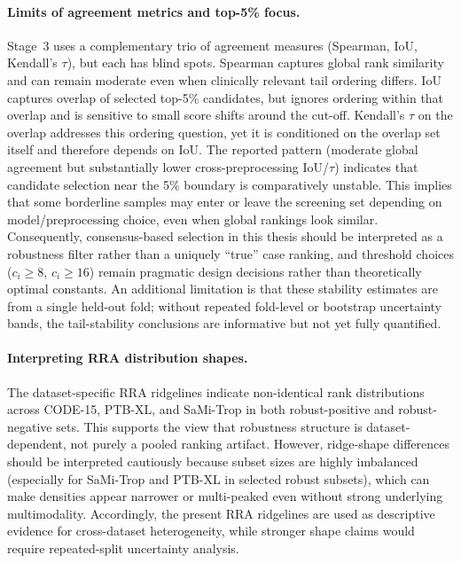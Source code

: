 \paragraph{Limits of agreement metrics and top-5\% focus.}
Stage~3 uses a complementary trio of agreement measures (Spearman, IoU, Kendall's \(\tau\)), but each has blind spots.
Spearman captures global rank similarity and can remain moderate even when clinically relevant tail ordering differs.
IoU captures overlap of selected top-5\% candidates, but ignores ordering within that overlap and is sensitive to small score shifts around the cut-off.
Kendall's \(\tau\) on the overlap addresses this ordering question, yet it is conditioned on the overlap set itself and therefore depends on IoU.
The reported pattern (moderate global agreement but substantially lower cross-preprocessing IoU/\(\tau\)) indicates that candidate selection near the 5\% boundary is comparatively unstable.
This implies that some borderline samples may enter or leave the screening set depending on model/preprocessing choice, even when global rankings look similar.
Consequently, consensus-based selection in this thesis should be interpreted as a robustness filter rather than a uniquely ``true'' case ranking, and threshold choices (\(c_i\geq 8\), \(c_i\geq 16\)) remain pragmatic design decisions rather than theoretically optimal constants.
An additional limitation is that these stability estimates are from a single held-out fold; without repeated fold-level or bootstrap uncertainty bands, the tail-stability conclusions are informative but not yet fully quantified.

\paragraph{Interpreting RRA distribution shapes.}
The dataset-specific RRA ridgelines indicate non-identical rank distributions across CODE-15, PTB-XL, and SaMi-Trop in both robust-positive and robust-negative sets.
This supports the view that robustness structure is dataset-dependent, not purely a pooled ranking artifact.
However, ridge-shape differences should be interpreted cautiously because subset sizes are highly imbalanced (especially for SaMi-Trop and PTB-XL in selected robust subsets), which can make densities appear narrower or multi-peaked even without strong underlying multimodality.
Accordingly, the present RRA ridgelines are used as descriptive evidence for cross-dataset heterogeneity, while stronger shape claims would require repeated-split uncertainty analysis.

